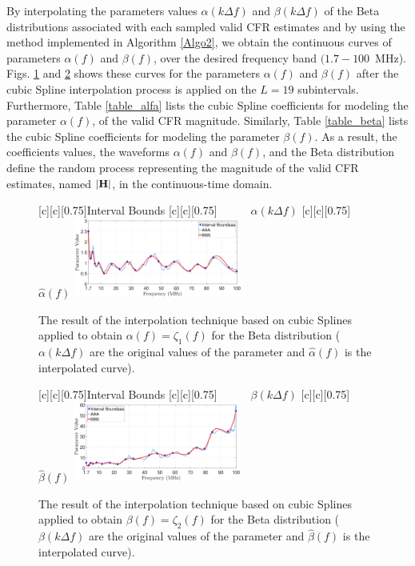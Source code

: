 \documentclass[journal]{IEEEtran}
\begin{document}
By interpolating the parameters values $\alpha(k\Delta f)$ and $\beta(k\Delta f)$ of the Beta distributions associated with each sampled valid \ac{CFR} estimates and by using the method implemented in Algorithm \ref{Algo2}, we obtain the continuous curves of parameters $\alpha(f)$ and $\beta(f)$, over the desired frequency band $(1.7-100$~MHz). Figs. \ref{Fit_alfa} and \ref{Fit_beta} shows these curves for the parameters $\alpha(f)$ and $\beta(f)$ after the cubic Spline interpolation process is applied on the $L=19$ subintervals. Furthermore, Table \ref{table_alfa} lists the cubic Spline coefficients for modeling the parameter $\alpha(f)$, of the valid \ac{CFR} magnitude. Similarly, Table \ref{table_beta} lists the cubic Spline coefficients for modeling the parameter $\beta(f)$. As a result, the coefficients values, the waveforms  $\alpha(f)$ and $\beta(f)$, and the Beta distribution define the random process representing the magnitude of the valid \ac{CFR} estimates, named $|{\bf H}|$, in the continuous-time domain.

\begin{figure}[h]
	\centering
	[c][0.75]{Interval Bounds}
	[c][0.75]{~~~~~~$\alpha(k \Delta f)$}
	[c][0.75]{~~$\hat{\alpha}(f)$}
	\includegraphics[width=0.49\textwidth]{images/Alfa_fit_1.7.eps}
	\caption{The result of the interpolation technique based on cubic Splines applied to obtain $\alpha(f) = \zeta_1(f)$ for the Beta distribution ($\alpha(k \Delta f)$ are the original values of the parameter and $\hat{\alpha}(f)$ is the interpolated curve).}
	\label{Fit_alfa}
\end{figure}

\begin{figure}[h]
	\centering
	[c][0.75]{Interval Bounds}
	[c][0.75]{~~~~~~$\beta(k \Delta f)$}
	[c][0.75]{~~$\hat{\beta}(f)$}
	\includegraphics[width=0.49\textwidth]{images/Beta_fit_1.7.eps}
	\caption{The result of the interpolation technique based on cubic Splines applied to obtain $\beta(f) = \zeta_2(f)$ for the Beta distribution ($\beta(k \Delta f)$ are the original values of the parameter and $\hat{\beta}(f)$ is the interpolated curve).}
	\label{Fit_beta}
\end{figure}
\end{document}
